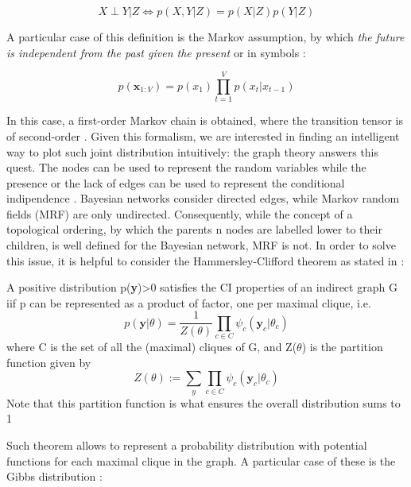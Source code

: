 \documentclass[12pt,%
               a4paper,%
               oneside,openany,%
               titlepage,%
               headinclude,footinclude,%
               BCOR5mm,%
               cleardoublepage=empty,%
               tablecaptionabove,%
               floatperchapter,
               ]{scrreprt}                 %
\begin{document}
\begin{equation}
X  \perp Y| Z \iff  p(X,Y|Z) = p(X|Z)p(Y|Z)
\end{equation}

A particular case of this definition is the Markov assumption,  by which \textit{the future is independent from the past given the present } or in symbols \cite{murphy2012machine}: 

\begin{equation}
p(\textbf{x}_{1:V})=p(x_{1})\prod^{V}_{t=1}p(x_{t}|x_{t-1})
\end{equation}

In this case, a first-order Markov chain is obtained,  where the transition tensor is of second-order \cite{wu2017markov}.  Given this formalism, we are interested in finding an intelligent way to plot such joint distribution intuitively: the graph theory answers this quest.  The nodes can be used to represent the random variables while the presence or the lack of edges can be used to represent the conditional indipendence \cite{murphy2012machine}.  Bayesian networks consider directed edges,  while Markov random fields (MRF) are only undirected.  Consequently,  while the concept of a topological ordering,  by which the parents n nodes are labelled lower to their children,  is well defined for the Bayesian network, MRF is not.  In order to solve this issue, it is helpful to consider the Hammersley-Clifford theorem as stated in \cite{murphy2012machine}:

\begin{theorem}
A positive distribution p(\textbf{y})>0 satisfies the CI properties of an indirect graph G iif p can be represented as a product of factor, one per maximal clique,  i.e.
\begin{equation}
p(\textbf{y}|\theta)= \dfrac{1}{Z(\theta)}\prod_{c \in C }\psi_{c}(\textbf{y}_{c}|\theta_{c})
\end{equation}
where C is the set of all the (maximal) cliques of G,  and Z($\theta$) is the partition function given by 
\begin{equation}
Z(\theta):= \sum_{y}\prod_{c\in C}\psi_{c}(\textbf{y}_{c}|\theta_{c})
\end{equation}
Note that this partition function is what ensures the overall distribution sums to 1
\end{theorem}

Such theorem allows to represent a probability distribution with potential functions for each maximal clique in the graph.  A particular case of these is the Gibbs distribution \cite{murphy2012machine}: 
\end{document}

